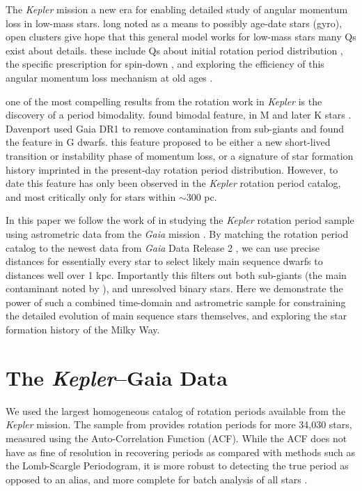 \documentclass[preprint2]{aastex62}
\newcommand{\Kepler}{\textsl{Kepler}\xspace}
\begin{document}
The \Kepler mission \citep{borucki2010} a new era for enabling detailed study of angular momentum loss in low-mass stars. long noted as a means to possibly age-date stars (gyro), open clusters give hope that this general model works for low-mass stars
many Qs exist about details. these include Qs about initial rotation period distribution \citep[e.g.][]{barnes2010,matt2015}, the specific prescription for spin-down \citep{angus2015}, and exploring the efficiency of this angular momentum loss mechanism at old ages \citep{van-saders2016}.


one of the most compelling results from the rotation work in \Kepler is the discovery of a period bimodality. 
\citet{mcquillan2013} found bimodal feature, in M and later K stars \citep{mcquillan2014}. Davenport used Gaia DR1 to remove contamination from sub-giants and found the feature in G dwarfs. this feature proposed to be either a new short-lived transition or instability phase of momentum loss, or a signature of star formation history imprinted in the present-day rotation period distribution. However, to date this feature has only been observed in the \Kepler rotation period catalog, and most critically only for stars within $\sim$300 pc.



In this paper we follow the work of \citet{davenport2017} in studying the \Kepler rotation period sample using astrometric data from the {\em Gaia} mission \citep{gaia}. By matching the \citet{mcquillan2014} rotation period catalog to the newest data from {\em Gaia} Data Release 2 \citep{gaia_dr2}, we can use precise distances for essentially every star to select likely main sequence dwarfs to distances well over 1 kpc. Importantly this filters out both sub-giants (the main contaminant noted by \cite{davenport2017}), and unresolved binary stars.
Here we demonstrate the power of such a combined time-domain and astrometric sample for constraining the detailed evolution of main sequence stars themselves, and exploring the star formation history of the Milky Way.
 



\section{The \Kepler--Gaia Data}

We used the largest homogeneous catalog of rotation periods available from the \Kepler mission. The sample from \citet{mcquillan2014} provides rotation periods for more 34,030 stars, measured using the Auto-Correlation Function (ACF). While the ACF does not have as fine of resolution in recovering periods as compared with methods such as the Lomb-Scargle Periodogram, it is more robust to detecting the true period as opposed to an alias, and more complete for batch analysis of all stars \citep[e.g. see][]{aigrain2015}.
\end{document}
